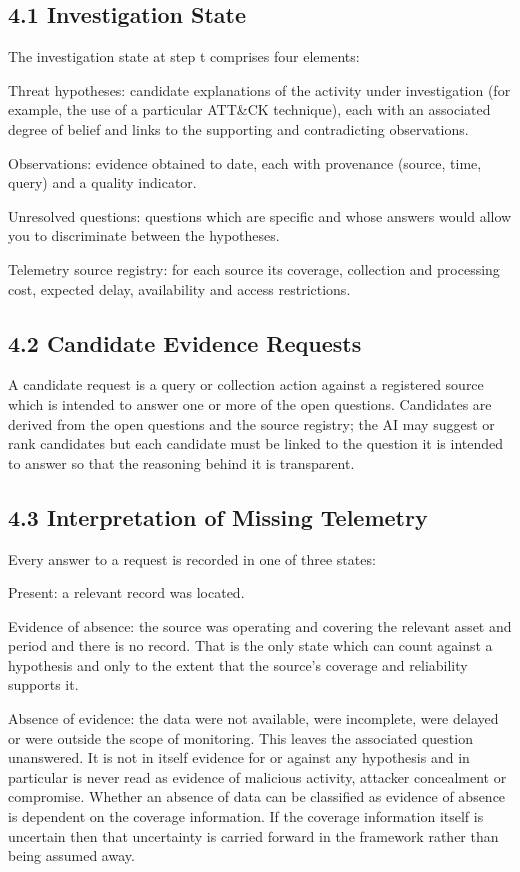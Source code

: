 \documentclass[a4paper,11pt]{article}
\begin{document}
\subsection{4.1 Investigation State}
The investigation state at step t comprises four elements:\par
Threat hypotheses: candidate explanations of the activity under investigation (for example, the use of a particular ATT\&CK technique), each with an associated degree of belief and links to the supporting and contradicting observations.\par
Observations: evidence obtained to date, each with provenance (source, time, query) and a quality indicator.\par
Unresolved questions: questions which are specific and whose answers would allow you to discriminate between the hypotheses.\par
Telemetry source registry: for each source its coverage, collection and processing cost, expected delay, availability and access restrictions.\par
\subsection{4.2 Candidate Evidence Requests}
A candidate request is a query or collection action against a registered source which is intended to answer one or more of the open questions. Candidates are derived from the open questions and the source registry; the AI may suggest or rank candidates but each candidate must be linked to the question it is intended to answer so that the reasoning behind it is transparent.\par
\subsection{4.3 Interpretation of Missing Telemetry}
Every answer to a request is recorded in one of three states:\par
Present: a relevant record was located.\par
Evidence of absence: the source was operating and covering the relevant asset and period and there is no record. That is the only state which can count against a hypothesis and only to the extent that the source's coverage and reliability supports it.\par
Absence of evidence: the data were not available, were incomplete, were delayed or were outside the scope of monitoring. This leaves the associated question unanswered. It is not in itself evidence for or against any hypothesis and in particular is never read as evidence of malicious activity, attacker concealment or compromise. Whether an absence of data can be classified as evidence of absence is dependent on the coverage information. If the coverage information itself is uncertain then that uncertainty is carried forward in the framework rather than being assumed away.\par
\end{document}
